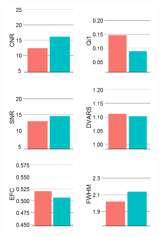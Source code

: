 \documentclass{frontiersSCNS} %
\begin{document}
\begin{figure}[h]
  \centering
    \includegraphics[width=4cm]{fig4_ratings_anat_CNR}
    \includegraphics[width=4cm]{fig4_ratings_anat_Qi1}
    \includegraphics[width=4cm]{fig4_ratings_anat_SNR}
    \includegraphics[width=4cm]{fig4_ratings_func_DVARS}
    \includegraphics[width=4cm]{fig4_ratings_func_EFC}
    \includegraphics[width=4cm]{fig4_ratings_func_FWHM}

\end{figure}
\end{document}
